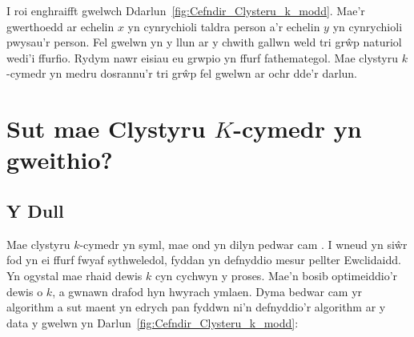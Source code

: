 I roi enghraifft gwelwch Ddarlun~\ref{fig:Cefndir_Clysteru_k_modd}. Mae'r gwerthoedd ar echelin $x$ yn cynrychioli taldra person a'r echelin $y$ yn cynrychioli pwysau'r person. Fel gwelwn yn y llun ar y chwith gallwn weld tri gr\^{w}p naturiol wedi'i ffurfio. Rydym nawr eisiau eu grwpio yn ffurf fathemategol. Mae clystyru $k$-cymedr yn medru dosrannu'r tri gr\^{w}p fel gwelwn ar ochr dde'r darlun. 


\section{Sut mae Clystyru $K$-cymedr yn gweithio?}

\subsection{Y Dull}

Mae clystyru $k$-cymedr yn syml, mae ond yn dilyn pedwar cam \cite{K-means-clustering}. I wneud yn si\^{w}r fod yn ei ffurf fwyaf sythweledol, fyddan yn defnyddio mesur pellter Ewclidaidd. Yn ogystal mae rhaid dewis $k$ cyn cychwyn y proses. Mae'n bosib optimeiddio'r dewis o $k$, a gwnawn drafod hyn hwyrach ymlaen. Dyma bedwar cam yr algorithm a sut maent yn edrych pan fyddwn ni'n defnyddio'r algorithm ar y data y gwelwn yn Darlun~\ref{fig:Cefndir_Clysteru_k_modd}:

